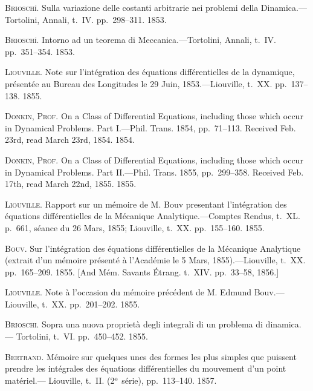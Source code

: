 \documentclass[11pt,a4paper]{book}
\begin{document}
\smallskip

\noindent\textsc{Briosch\'\i}. Sulla variazione delle costanti arbitrarie nei problemi della Dinamica.---
Tortolini, Annali, t.~IV. pp.~298--311. 1853.

\smallskip

\noindent\textsc{Briosch\'\i}. Intorno ad un teorema di Meccanica.---Tortolini, Annali, t.~IV. pp.~351--354.
1853.

\smallskip

\noindent\textsc{Liouville}. Note sur l'int\'egration des \'equations diff\'erentielles de la dynamique, pr\'esent\'ee
au Bureau des Longitudes le 29 Juin, 1853.---Liouville, t.~XX. pp.~137--138. 1855.

\smallskip

\noindent\textsc{Donkin, Prof.} On a Class of Differential Equations, including those which occur in
Dynamical Problems. Part I.---Phil. Trans. 1854, pp.~71--113. Received Feb. 23rd,
read March 23rd, 1854. 1854.

\smallskip

\noindent\textsc{Donkin, Prof.} On a Class of Differential Equations, including those which occur in
Dynamical Problems. Part II.---Phil. Trans. 1855, pp.~299--358. Received Feb. 17th,
read March 22nd, 1855. 1855.

\smallskip

\noindent\textsc{Liouville}. Rapport sur un m\'emoire de M. Bouv presentant l'int\'egration des \'equations
diff\'erentielles de la M\'ecanique Analytique.---Comptes Rendus, t.~XL. p.~661, s\'eance
du 26 Mars, 1855; Liouville, t.~XX. pp.~155--160. 1855.

\smallskip

\noindent\textsc{Bouv}. Sur l'int\'egration des \'equations diff\'erentielles de la M\'ecanique Analytique
(extrait d'un m\'emoire pr\'esent\'e \`a l'Acad\'emie le 5 Mars, 1855).---Liouville, t.~XX.
pp.~165--209. 1855. [And M\'em. Savants \'Etrang. t.~XIV. pp.~33--58, 1856.]

\smallskip

\noindent\textsc{Liouville}. Note \`a l'occasion du m\'emoire pr\'ec\'edent de M. Edmund Bouv.---Liouville,
t.~XX. pp.~201--202. 1855.

\smallskip

\noindent\textsc{Brioschi}. Sopra una nuova propriet\`a degli integrali di un problema di dinamica.---
Tortolini, t.~VI. pp.~450--452. 1855.

\smallskip

\noindent\textsc{Bertrand}. M\'emoire sur quelques unes des formes les plus simples que puissent prendre
les int\'egrales des \'equations diff\'erentielles du mouvement d'un point mat\'eriel.---
Liouville, t.~II. (2$^{\rm e}$ s\'erie), pp.~113--140. 1857.
\end{document}
